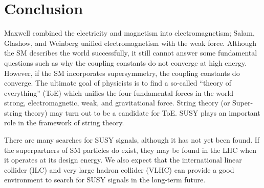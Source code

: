 \documentclass[12pt]{report}
\begin{document}
\chapter{Conclusion}
Maxwell combined the electricity and magnetism into electromagnetism; Salam, Glashow, and Weinberg unified electromagnetism with the weak force.
Although the SM describes the world successfully, it still cannot answer some fundamental questions such as why the coupling constants do not converge at high energy.
However, if the SM incorporates supersymmetry, the coupling constants do converge.  
The ultimate goal of physicists is to find a so-called ``theory of everything'' (ToE) which unifies the four fundamental forces in the world -- strong, electromagnetic, weak, and gravitational force.
String theory (or Super-string theory) may turn out to be a candidate for ToE.
SUSY plays an important role in the framework of string theory.

There are many searches for SUSY signals, although it has not yet been found.
If the superpartners of SM particles do exist, they may be found in the LHC when it operates at its design energy.
We also expect that the international linear collider (ILC) and very large hadron collider (VLHC) can provide a good environment to search for SUSY signals in the long-term future. 


\end{document}
